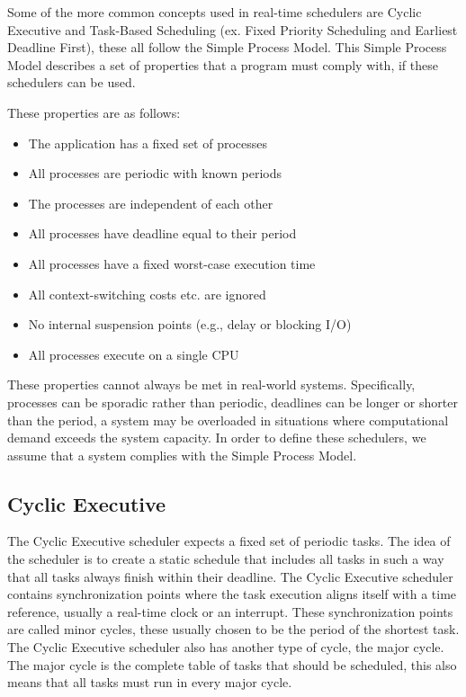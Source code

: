 Some of the more common concepts used in real-time schedulers are Cyclic Executive and Task-Based Scheduling (ex. Fixed Priority Scheduling and Earliest Deadline First), these all follow the Simple Process Model. This Simple Process Model describes a set of properties that a program must comply with, if these  schedulers can be used.

These properties are as follows\cite{simpleprocessmodel-slides}:

\begin{itemize}
\item The application has a fixed set of processes
\item All processes are periodic with known periods
\item The processes are independent of each other
\item All processes have deadline equal to their period
\item All processes have a fixed worst-case execution time
\item All context-switching costs etc. are ignored
\item No internal suspension points (e.g., delay or blocking I/O)
\item All processes execute on a single CPU
\end{itemize}

These properties cannot always be met in real-world systems. Specifically, processes can be sporadic rather than periodic, deadlines can be longer or shorter than the period, a system may be overloaded in situations where computational demand exceeds the system capacity. In order to define these schedulers, we assume that a system complies with the Simple Process Model.

\subsection{Cyclic Executive}
The Cyclic Executive scheduler expects a fixed set of periodic tasks. The idea of the scheduler is to create a static schedule that includes all tasks in such a way that all tasks always finish within their deadline. The Cyclic Executive scheduler contains synchronization points where the task execution aligns itself with a time reference, usually a real-time clock or an interrupt. These synchronization points are called minor cycles, these usually chosen to be the period of the shortest task. The Cyclic Executive scheduler also has another type of cycle, the major cycle. The major cycle is the complete table of tasks that should be scheduled, this also means that all tasks must run in every major cycle.

